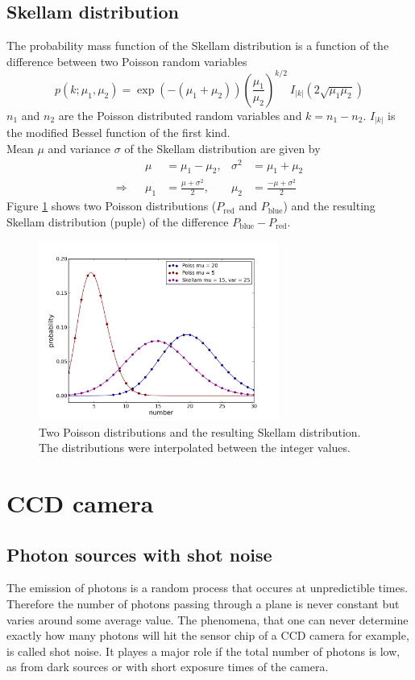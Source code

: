 \subsection{Skellam distribution}
The probability
mass function of the Skellam distribution is a function of the difference between
two Poisson random variables
\begin{equation}
	p(k;\mu_1, \mu_2) =
	\exp(-(\mu_1+\mu_2))\left(\frac{\mu_1}{\mu_2}\right)^{k/2}~I_{|k|}\left(2\sqrt{\mu_1
	\mu_2}\right)
\end{equation}  
$n_1$ and $n_2$ are the Poisson distributed random variables and $k = n_1 - n_2$.
$I_{|k|}$ is the modified Bessel function of the first kind.\\
Mean $\mu$ and variance $\sigma$ of the Skellam distribution are given by
\begin{align}
	&&\mu &= \mu_1 - \mu_2,& \sigma^2 &= \mu_1 + \mu_2\\
	\Rightarrow &&\mu_1& = \frac{\mu + \sigma^2}{2},& \mu_2 &=\frac{-\mu +
	\sigma^2}{2}
\end{align}
Figure \ref{skellamdist} shows two Poisson distributions ($P_\text{red}$ and $P_\text{blue}$) and the resulting Skellam distribution (puple) of the difference $P_\text{blue} - P_\text{red}$.
\begin{figure}
\centering
\includegraphics[width = 0.7\textwidth]{pictures/skellamdist.png}
	\caption{Two Poisson distributions and the resulting Skellam distribution. The distributions were interpolated between the integer values.}
	\label{skellamdist}
\end{figure}




\section{CCD camera}
\subsection{Photon sources with shot noise}
The emission of photons is a random process that occures at unpredictible times. Therefore the number of photons passing through a plane is never constant but varies around some average value. The phenomena, that one can never determine exactly how many photons will hit the sensor chip of a CCD camera for example, is called shot noise. It playes a major role if the total number of photons is low, as from dark sources or with short exposure times of the camera.
